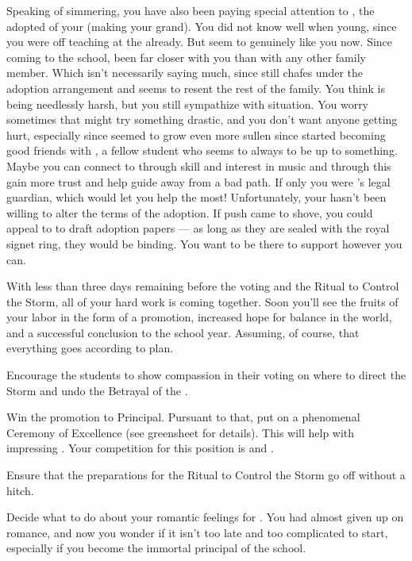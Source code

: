 \documentclass[char]{GL2020}
\begin{document}
Speaking of simmering, you have also been paying special attention to \cAdopted{\intro}, the adopted \cAdopted{\offspring} of your \cAdoptedParentOne{\nibling} (making \cAdopted{} your grand\cAdopted{\nibling}). You did not know \cAdopted{} well when \cAdopted{\theywere} young, since you were off teaching at the \pSc{} already. But \cAdopted{\they} seem\cAdopted{\verbs} to genuinely like you now. Since coming to the school, \cAdopted{\theyhave} been far closer with you than with any other family member. Which isn't necessarily saying much, since \cAdopted{} still chafes under the adoption arrangement and seems to resent the rest of the family. You think \cAdopted{} is being needlessly harsh, but you still sympathize with \cAdopted{\their} situation. You worry sometimes that \cAdopted{} might try something drastic, and you don't want anyone getting hurt, especially since \cAdopted{\theyhave} seemed to grow even more sullen since \cAdopted{\they} started becoming good friends with \cLibAssist{\intro}, a fellow \pFarm{} student who seems to always to be up to something. Maybe you can connect to \cAdopted{\their} through \cAdopted{\their} skill and interest in music and through this gain more trust and help guide \cAdopted{\them} away from a bad path. If only you were \cAdopted{}’s legal guardian, which would let you help the most! Unfortunately, your \cAdoptedParentOne{\nibling} hasn't been willing to alter the terms of the adoption. If push came to shove, you could appeal to \cPrince{\intro} to draft adoption papers — as long as they are sealed with the royal signet ring, they would be binding. You want to be there to support \cAdopted{} however you can. 

With less than three days remaining before the voting and the Ritual to Control the Storm, all of your hard work is coming together. Soon you'll see the fruits of your labor in the form of a promotion, increased hope for balance in the world, and a successful conclusion to the school year. Assuming, of course, that everything goes according to plan.

\begin{itemz}
    \item Encourage the students to show compassion in their voting on where to direct the Storm and undo the Betrayal of the \pShip{}.
    \item Win the promotion to Principal. Pursuant to that, put on a phenomenal Ceremony of Excellence (see greensheet for details). This will help with impressing \cPrincipal{}. Your competition for this position is \cBeetle{} and \cChupSecond{}.
    \item Ensure that the preparations for the Ritual to Control the Storm go off without a hitch.
    \item Decide what to do about your romantic feelings for \cFlowPriest{}. You had almost given up on romance, and now you wonder if it isn’t too late and too complicated to start, especially if you become the immortal principal of the school.
\end{itemz}
\end{document}
